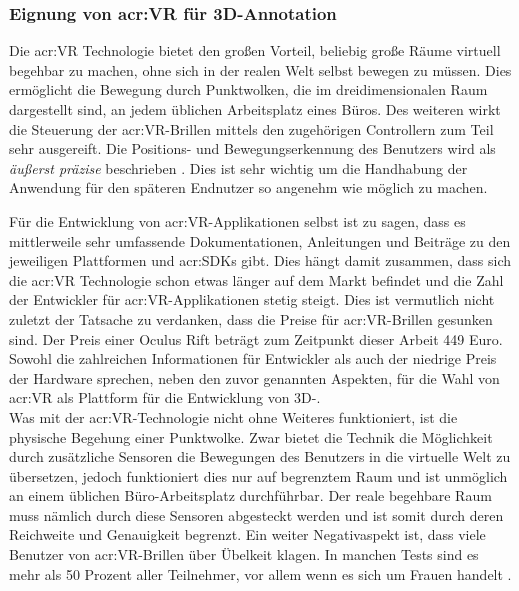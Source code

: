 \subsubsection{Eignung von \acrlong{acr:VR} für 3D-Annotation} 

Die \acrlong{acr:VR} Technologie bietet den großen Vorteil, beliebig große Räume virtuell begehbar zu machen, ohne sich in der realen Welt selbst bewegen zu müssen. Dies ermöglicht die Bewegung durch Punktwolken, die im dreidimensionalen Raum dargestellt sind, an jedem üblichen Arbeitsplatz eines Büros. Des weiteren wirkt die Steuerung der \acrshort{acr:VR}-Brillen mittels den zugehörigen Controllern zum Teil sehr ausgereift. Die Positions- und Bewegungserkennung des Benutzers wird als \textit{\glqq äußerst präzise\grqq} beschrieben \cite{bib:ControllerTest}. Dies ist sehr wichtig um die Handhabung der Anwendung für den späteren Endnutzer so angenehm wie möglich zu machen.

Für die Entwicklung von \acrshort{acr:VR}-Applikationen selbst ist zu sagen, dass es mittlerweile sehr umfassende Dokumentationen, Anleitungen und Beiträge zu den jeweiligen Plattformen und \glspl{acr:SDK} gibt. Dies hängt damit zusammen, dass sich die \acrlong{acr:VR} Technologie schon etwas länger auf dem Markt befindet und die Zahl der Entwickler für \acrshort{acr:VR}-Applikationen stetig steigt. Dies ist vermutlich nicht zuletzt der Tatsache zu verdanken, dass die Preise für \acrshort{acr:VR}-Brillen gesunken sind. Der Preis einer Oculus Rift beträgt zum Zeitpunkt dieser Arbeit 449 Euro. Sowohl die zahlreichen Informationen für Entwickler als auch der niedrige Preis der Hardware sprechen, neben den zuvor genannten Aspekten, für die Wahl von \acrlong{acr:VR} als Plattform für die Entwicklung von 3D-.\\

Was mit der \acrshort{acr:VR}-Technologie nicht ohne Weiteres funktioniert, ist die physische Begehung einer Punktwolke. Zwar bietet die Technik die Möglichkeit durch zusätzliche Sensoren die Bewegungen des Benutzers in die virtuelle Welt zu übersetzen, jedoch funktioniert dies nur auf begrenztem Raum und ist unmöglich an einem üblichen Büro-Arbeitsplatz durchführbar. Der reale begehbare Raum muss nämlich durch diese Sensoren abgesteckt werden und ist somit durch deren Reichweite und Genauigkeit begrenzt. Ein weiter Negativaspekt ist, dass viele Benutzer von \acrshort{acr:VR}-Brillen über Übelkeit klagen. In manchen Tests sind es mehr als 50 Prozent aller Teilnehmer, vor allem wenn es sich um Frauen handelt \cite{bib:VRSickness}. 

